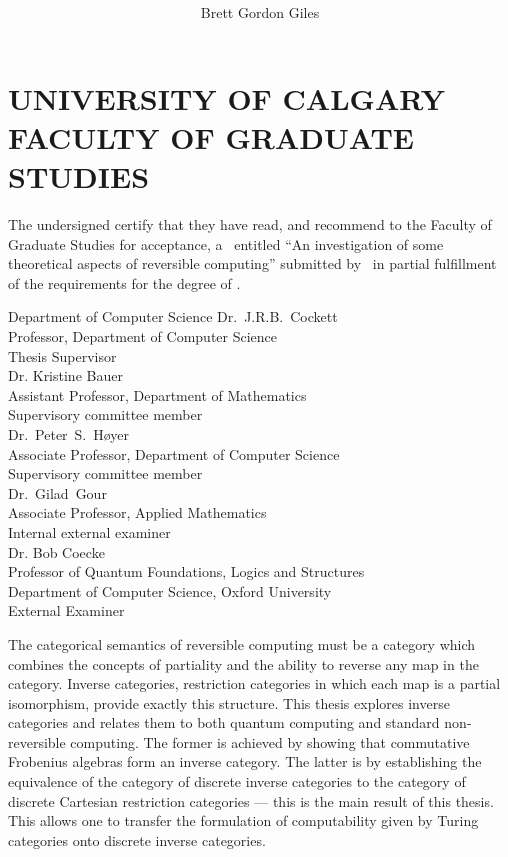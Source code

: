 \documentclass{ucalgthes1}
\title{\thesistitle \\
\bigskip  }
\author{Brett Gordon Giles}
\newcommand{\thesistitle}{An investigation of some theoretical aspects of reversible computing}
\begin{document}
\makethesistitle
{}     %
\setcounter{page}{1}
\chapter*{UNIVERSITY OF CALGARY \\ FACULTY OF GRADUATE STUDIES}
\thispagestyle{empty}
The undersigned certify that they have read, and recommend
to the Faculty of Graduate Studies for acceptance, a \Thesis\ entitled
``\thesistitle'' submitted by \Author\
in partial fulfillment of the requirements for the degree of
\Degree.\\
\begin{signing}{Department of Computer Science}
\signline
Dr.~J.R.B.~Cockett\\
Professor, Department of Computer Science \\
Thesis Supervisor\\
\signline
Dr. Kristine Bauer \\
Assistant Professor, Department of Mathematics \\
Supervisory committee member  \\
\signline
Dr.~Peter~S.~Høyer \\
Associate Professor, Department of Computer Science \\
Supervisory committee member  \\
\newsigncolumn
\signline
Dr.~Gilad~Gour \\
Associate Professor, Applied Mathematics\\
Internal external examiner  \\
\signline
Dr. Bob Coecke\\
Professor of Quantum Foundations, Logics and Structures\\
Department of Computer Science,  Oxford University \\
External Examiner
\end{signing}
%
\newpage
{}
{}
The categorical semantics of reversible computing must be a category which combines the concepts of
partiality and the ability to reverse any map in the category. Inverse categories, restriction
categories in which each map is a partial isomorphism, provide exactly this structure. This thesis
explores inverse categories and relates them to both quantum computing and standard non-reversible
computing. The former is achieved by showing that commutative Frobenius algebras form an inverse
category. The latter is by establishing the equivalence of the category of discrete inverse
categories to the category of discrete Cartesian restriction categories --- this is the main result
of this thesis. This allows one to transfer the formulation of computability given by Turing
categories onto discrete inverse categories.
\end{document}
